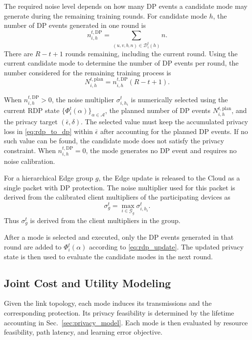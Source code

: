 \documentclass[5p,times]{elsarticle}
\theoremstyle{plain}
\theoremstyle{definition}
\theoremstyle{remark}
\begin{document}
The required noise level depends on how many DP events a candidate mode
may generate during the remaining training rounds. For candidate mode
\(h\), the number of DP events generated in one round is
\begin{equation}
n_{i,h}^{t,\mathrm{DP}}
=
\sum_{(u,v,b,n)\in\mathcal D_i^t(h)} n.
\label{eq:dp_events_per_round}
\end{equation}
There are \(R-t+1\) rounds remaining, including the current round.
Using the current candidate mode to determine the number of DP events per
round, the number considered for the remaining training process is
\begin{equation}
N_{i,h}^{t,\mathrm{plan}}
=
n_{i,h}^{t,\mathrm{DP}}(R-t+1).
\label{eq:planned_update_events}
\end{equation}

When \(n_{i,h}^{t,\mathrm{DP}}>0\), the noise multiplier
\(\sigma_{i,h_i}^t\) is numerically selected using the current RDP state
\(\{\Phi_i^t(\alpha)\}_{\alpha\in\mathcal A}\), the planned number of DP
events \(N_{i,h}^{t,\mathrm{plan}}\), and the privacy target
\((\bar{\epsilon},\delta)\). The selected value must keep the accumulated
privacy loss in \eqref{eq:rdp_to_dp} within
\(\bar{\epsilon}\) after accounting for the planned DP events. If no such
value can be found, the candidate mode does not satisfy the privacy
constraint. When \(n_{i,h}^{t,\mathrm{DP}}=0\), the mode generates no DP
event and requires no noise calibration.

For a hierarchical Edge group \(g\), the Edge update is released to the Cloud as a single packet with DP protection. The noise
multiplier used for this packet is derived from the calibrated client
multipliers of the participating devices as
\begin{equation}
\sigma_g^t
=
\max_{i\in\mathcal G_g}
\sigma_{i,h_i}^t .
\label{eq:edge_group_noise_multiplier}
\end{equation}
Thus \(\sigma_g^t\) is derived from the client multipliers in the group.

After a mode is selected and executed, only the DP events generated in
that round are added to \(\Phi_i^t(\alpha)\) according to
\eqref{eq:rdp_update}. The updated privacy state is then used to evaluate
the candidate modes in the next round.
\subsection{Joint Cost and Utility Modeling}
\label{sec:cost_utility_model}
Given the link topology, each mode induces its transmissions and the corresponding protection. Its privacy feasibility is determined by the lifetime accounting in Sec.~\ref{sec:privacy_model}. Each mode is then evaluated by resource feasibility, path latency, and learning error objective.
\end{document}
